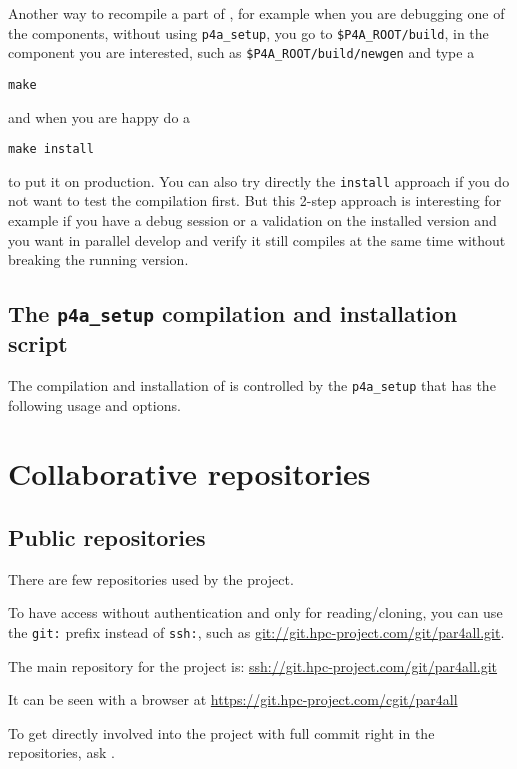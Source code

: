 \documentclass[a4paper]{article}
\begin{document}
Another way to recompile a part of \Apfa, for example when you are
debugging one of the components, without using \verb|p4a_setup|, you go to
\verb|$P4A_ROOT/build|, in the component you are interested, such as
\verb|$P4A_ROOT/build/newgen| and type a
\begin{verbatim}
make
\end{verbatim}
and when you are happy do a
\begin{verbatim}
make install
\end{verbatim}
to put it on production. You can also try directly the \texttt{install}
approach if you do not want to test the compilation first. But this 2-step
approach is interesting for example if you have a debug session or a
validation on the installed version and you want in parallel develop and
verify it still compiles at the same time without breaking the running
version.


\subsection{The \protect\texttt{p4a\_setup} compilation and installation
script}
\label{sec:p4a_s-comp-script}

The compilation and installation of \Apfa is controlled by the
\verb|p4a_setup| that has the following usage and options.




\section{Collaborative repositories}
\label{sec:coll-repos}


\subsection{Public repositories}
\label{sec:public-repositories}

There are few \Agit repositories used by the project.

To have access without authentication and only for reading/cloning, you
can use the \texttt{git:} prefix instead of \texttt{ssh:}, such as
\url{git://git.hpc-project.com/git/par4all.git}.

The main repository for the project is:
\url{ssh://git.hpc-project.com/git/par4all.git}

It can be seen with a \Awww browser at
\url{https://git.hpc-project.com/cgit/par4all}

To get directly involved into the project with full commit right in the
repositories, ask \Ahpcp.
\end{document}
